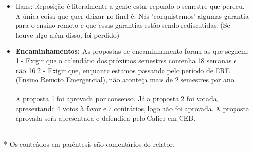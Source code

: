 \documentclass{ata-calico}
\begin{document}
\begin{itemize}
    \item Hans: Reposição é literalmente a gente estar repondo o semestre que perdeu. A única coisa que quer deixar no final é: Nós 'conquistamos' algumas garantia para o ensino remoto e que essas garantias estão sendo rediscutidas. (Se houve algo além disso, foi perdido)
    
    \item \textbf{Encaminhamentos:} As propostas de encaminhamento foram as que seguem: \\
    1 - Exigir que o calendário dos próximos semestres contenha 18 semanas e não 16
    2 - Exigir que, enquanto estamos passando pelo período de ERE (Ensino Remoto Emergencial), não aconteça mais de 2 semestres por ano. \\\\
    
    A proposta 1 foi aprovada por consenso. Já a proposta 2 foi votada, apresentando 4 votos à favor e 7 contrários, logo não foi aprovada. A proposta aprovada seŕa apresentada e defendida pelo Calico em CEB.
\end{itemize}

\\

* Os conteúdos em parêntesis são comentários do relator.
\end{document}
